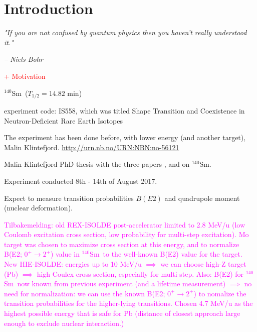 \documentclass[twoside,english]{uiofysmaster/uiofysmaster}
\newcommand{\Sm}{$^{140}$Sm} %
\begin{document}
\chapter{Introduction}
\epigraph{\textit{"If you are not confused by quantum physics then you haven't really understood it."}}{\textit{– Niels Bohr}}

\textcolor{red}{+ Motivation}

\bigskip

\Sm\ ($T_{1/2} = 14.82$ min)

\bigskip

experiment code: IS558, which was titled Shape Transition and Coexistence in Neutron-Deficient Rare Earth Isotopes

\bigskip

The experiment has been done before, with lower energy (and another target), Malin Klintefjord. \url{http://urn.nb.no/URN:NBN:no-56121} \newline
 
Malin Klintefjord PhD thesis \cite{Klintefjord} with the three papers \cite{Klintefjord2015}, \cite{Samorajczyk2015} and \cite{Klintefjord2016} on \Sm.
 
\bigskip
 
Experiment conducted 8th - 14th of August 2017.

\bigskip

Expect to measure transition probabilities $B(E2)$ and quadrupole moment (nuclear deformation). 

\bigskip

\textcolor{Magenta}{Tilbakemelding: \newline 
old REX-ISOLDE post-accelerator limited to 2.8 MeV/u (low Coulomb excitation cross section, low probability for multi-step excitation). Mo target was chosen to maximize cross section at this energy, and to normalize B(E2; $0^+ \rightarrow 2^+$) value in \Sm\ to the well-known B(E2) value for the target. \newline
New HIE-ISOLDE: energies up to 10 MeV/u $\implies$ we can choose high-Z target (Pb) $\implies$ high Coulex cross section, especially for multi-step. Also: B(E2) for \Sm\ now known from previous experiment (and a lifetime measurement) $\implies$ no need for normalization: we can use the known B(E2; $0^+ \rightarrow 2^+$) to nomalize the transition probabilities for the higher-lying transitions. Chosen 4.7 MeV/u as the highest possible energy that is safe for Pb (distance of closest approach large enough to exclude nuclear interaction.)} \newline
\end{document}
